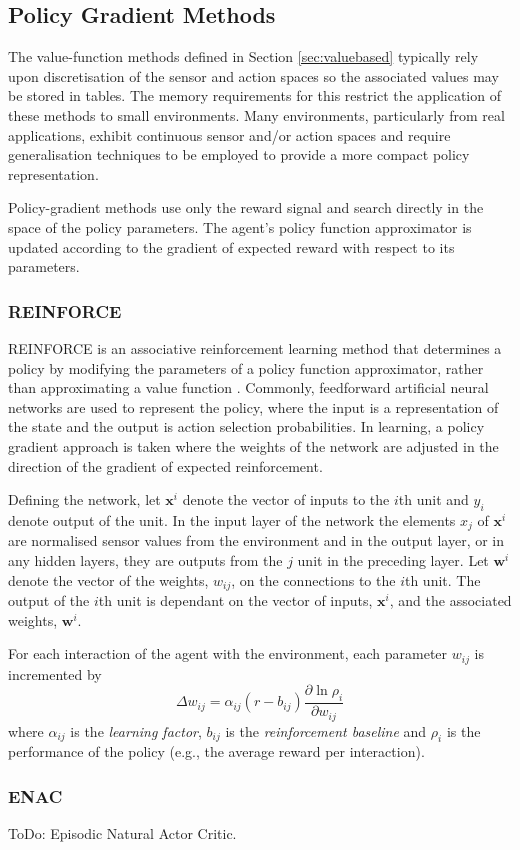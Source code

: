 \subsection{Policy Gradient Methods}
\label{sec:policygradient}
The value-function methods defined in Section \ref{sec:valuebased} typically
rely upon discretisation of the sensor and action spaces so the associated
values may be stored in tables.  The memory requirements for this restrict the
application of these methods to small environments.  Many environments,
particularly from real applications, exhibit continuous sensor and/or action
spaces and require generalisation techniques to be employed to provide a more
compact policy representation.

Policy-gradient methods use only the reward signal and search directly in the
space of the policy parameters.  The agent's policy function approximator is
updated according to the gradient of expected reward with respect to its
parameters.

\subsubsection{REINFORCE}
\label{sec:reinforce}
REINFORCE is an associative reinforcement learning method that determines
a policy by modifying the parameters of a policy function approximator, rather
than approximating a value function \cite{williams:reinforce}.  Commonly,
feedforward artificial neural networks are used to represent the policy, where
the input is a representation of the state and the output is action selection
probabilities.  In learning, a policy gradient approach is taken where the
weights of the network are adjusted in the direction of the gradient of
expected reinforcement.

Defining the network, let $\mathbf{x}^i$ denote the vector of inputs to the
$i$th unit and $y_i$ denote output of the unit.  In the input layer of the
network the elements $x_j$ of $\mathbf{x}^i$ are normalised sensor values from
the environment and in the output layer, or in any hidden layers, they are
outputs from the $j$ unit in the preceding layer.  Let $\mathbf{w}^i$ denote
the vector of the weights, $w_{ij}$, on the connections to the $i$th unit.  The
output of the $i$th unit is dependant on the vector of inputs, $\mathbf{x}^i$,
and the associated weights, $\mathbf{w}^i$.

For each interaction of the agent with the environment, each parameter $w_{ij}$
is incremented by
\begin{equation}
\label{eq:reinforce}
\Delta w_{ij} = \alpha_{ij}(r - b_{ij})\frac{\partial\ln\rho_i}{\partial
w_{ij}}
\end{equation}
where $\alpha_{ij}$ is the \textit{learning factor}, $b_{ij}$ is the
\textit{reinforcement baseline} and $\rho_i$ is the performance of the policy
(e.g., the average reward per interaction).

\subsubsection{ENAC}
\label{sec:enac}
ToDo: Episodic Natural Actor Critic\cite{peters:enac}.
